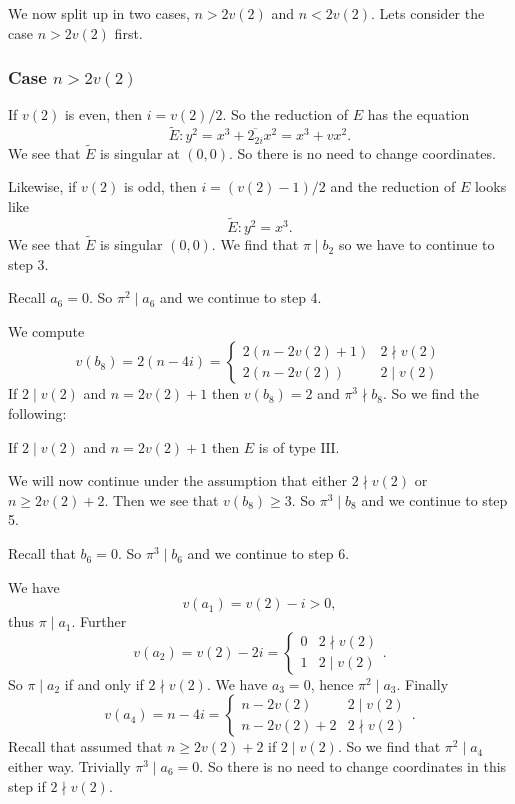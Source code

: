 We now split up in two cases, $n > 2v(2)$ and $n < 2v(2)$. 
Lets consider the case  $n > 2v(2)$ first.
\subsubsection{Case $n > 2v(2)$} \label{sec:case_n_>_2v2$}

If $v(2)$ is even, then $i = v(2) / 2$. 
So the reduction of $E$ has the equation \[
	\tilde E: y^2 = x^3  + \overline{2_{2i}} x^2  = x^3 + vx^2 
.\]
We see that $\tilde E$ is singular at $(0,0)$. 
So there is no need to change coordinates.

Likewise, if $v(2)$ is odd, 
then $i = (v(2)-1) / 2$ and the reduction of $E$ looks like 
\[
\tilde E: y^2 = x^3 
.\] 
We see that  $\tilde E$ is singular $(0, 0)$. 
We find that $\pi \mid b_2$ so we have to continue to step 3. 

Recall $a_6 = 0$. So $\pi^2 \mid a_6$ and we continue to step 4. 

We compute \[
	v(b_8) = 2(n - 4i) = \begin{cases}
		2(n - 2v(2) + 1) & 2 \nmid v(2) \\
		2(n - 2v(2)) & 2 \mid v(2) 
	\end{cases} 
\]
If $2\mid v(2)$ and $n = 2v(2) + 1$ then $v(b_8) = 2$ and $\pi^3 \nmid b_8$. 
So we find the following:
\begin{tateconclusion}
	If $2 \mid v(2)$ and $n = 2v(2) + 1$ then $E$ is of type $\mathrm{III}$.
\end{tateconclusion}
We will now continue under the assumption that either $2\nmid v(2) $ or $n \ge 2v(2) +2$.
Then we see that $v(b_8) \ge 3$. 
So $\pi^3\mid b_8$ and we continue to step 5.

Recall that $b_6 = 0$. So $\pi^3 \mid b_6$ and we continue to step 6. 

We have  \[
	v(a_1) = v(2) - i > 0
,\] 
thus $\pi \mid a_1$. 
Further \[
	v(a_2) = v(2) - 2i = \begin{cases}
		0 & 2 \nmid v(2) \\
		1 & 2 \mid v(2)
	\end{cases}
.\] 
So $\pi \mid a_2$ if and only if $2 \nmid v(2)$.
We have $a_3 = 0$, hence $\pi^2 \mid a_3$. 
Finally \[
	v(a_4) = n - 4i = \begin{cases}
		n - 2v(2) & 2 \mid v(2) \\
		n - 2v(2) + 2 & 2 \nmid v(2)
	\end{cases}
.\] 
Recall that assumed that $n \ge 2v(2) + 2$ if $2 \mid v(2)$. 
So we find that $\pi^2 \mid a_4$ either way. 
Trivially $\pi^3 \mid a_6 = 0$. 
So there is no need to change coordinates in this step if $2\nmid v(2)$. 


